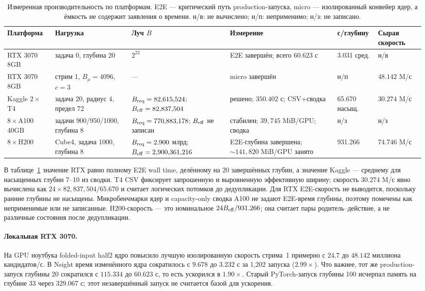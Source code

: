 \documentclass[10pt,twocolumn]{article}
\begin{document}
\begin{table}[t]
\centering
\footnotesize
\caption{Измеренная производительность по платформам. E2E --- критический путь
production-запуска, micro --- изолированный конвейер ядер, а ёмкость не содержит
заявления о времени. н/в: не вычислено; н/п: неприменимо; н/з: не записано.}
\label{tab:platforms}
\setlength{\tabcolsep}{3pt}
\begin{tabular}{@{}p{2.0cm}p{2.4cm}p{3.8cm}p{3.2cm}p{1.8cm}p{1.8cm}@{}}
\toprule
Платформа & Нагрузка & Луч $B$ & Измерение & с/глубину & Сырая скорость \\
\midrule
RTX 3070 8GB & задача 0, глубина 20 & $2^{22}$ & E2E завершён; всего $60.623$ с & 3.031 сред. & н/в \\
RTX 3070 8GB & стрим 1, $B_\mu=4096$, $c=3$ & --- & micro завершён & н/п & $48.142$ M/с \\
Kaggle $2\times$T4 & задача 20, радиус 4, предел 72 & $B_{\rm req}=82{,}615{,}524$; $B_{\rm eff}=82{,}837{,}504$ & решено; $350.402$ с; CSV+сводка & 65.670 насыщ. & $30.274$ M/с \\
$8\times$A100 40GB & задачи 900/950/1000, глубина 8 & $B_{\rm req}=770{,}883{,}178$; $B_{\rm eff}$ не записан & стабилен; $39{,}745$ MiB/GPU; сводка & н/з & н/з \\
$8\times$H200 & Cube4, задача 1000, глубина 8 & $B_{\rm req}=2.900$ млрд; $B_{\rm eff}=2{,}900{,}361{,}216$ & E2E-глубина завершена; $\sim141{,}820$ MiB/GPU занято & 931.266 & $74.746$ M/с \\
\bottomrule
\end{tabular}
\end{table}

В таблице~\ref{tab:platforms} значение RTX равно полному E2E wall time,
делённому на 20 завершённых глубин, а значение Kaggle --- среднему для
насыщенных глубин 7--10 из сводки. T4 CSV фиксирует запрошенную и выровненную
эффективную ширину; скорость $30.274$ M/с явно вычислена как
$24\times82{,}837{,}504/65.670$ и считает логических потомков до дедупликации.
Для RTX E2E-скорость не выводится, поскольку ранние глубины не насыщены.
Микробенчмарки ядер и capacity-only сводка A100 не задают E2E-время глубины,
поэтому помечены как неприменимые или не записанные. H200-скорость --- это
номинальное $24B_{\rm eff}/931.266$; она считает пары родитель--действие, а не
различные состояния после дедупликации.

\paragraph{Локальная RTX 3070.}
На GPU ноутбука folded-input half2 ядро повысило лучшую изолированную скорость
стрима~1 примерно с $24.7$ до $48.142$ миллиона кандидатов/с. В Nsight время
изменённого ядра сократилось с $9.678$ до $3.232$ с за 1,202 запуска
($2.99\times$). Что важнее, тот же production-запуск глубины 20 сократился с
$115.334$ до $60.623$ с, то есть ускорился в $1.90\times$. Старый PyTorch-запуск
глубины 100 исчерпал память на глубине 33 через $329.067$ с; этот незавершённый
запуск не считается базой для ускорения.
\end{document}
